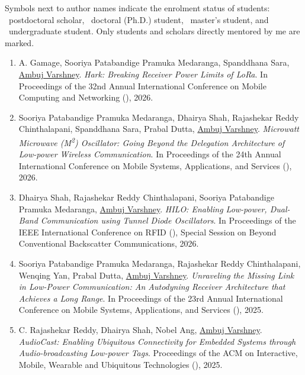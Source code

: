 
\providecommand{\symbollegend}[1]{#1}
\symbollegend{Symbols next to author names indicate the enrolment status of students: \postdoc~postdoctoral scholar, \phd~doctoral (Ph.D.) student, \pg~master's student, and \ug~undergraduate student. Only students and scholars directly mentored by me are marked.}

\begin{enumerate}


\item A. Gamage\postdoc, Sooriya Patabandige Pramuka Medaranga\phd, Spanddhana Sara\phd, \underline{Ambuj Varshney}.
\emph{Hark: Breaking Receiver Power Limits of LoRa}.
In Proceedings of the 32nd Annual International Conference on Mobile Computing and Networking (), 2026.

\item Sooriya Patabandige Pramuka Medaranga\phd, Dhairya Shah\phd, Rajashekar Reddy Chinthalapani\phd, Spanddhana Sara\phd, Prabal Dutta, \underline{Ambuj Varshney}.
\emph{Microwatt Microwave (M\textsuperscript{2}) Oscillator: Going Beyond the Delegation Architecture of Low-power Wireless Communication}.
In Proceedings of the 24th Annual International Conference on Mobile Systems, Applications, and Services (), 2026.

\item Dhairya Shah\phd, Rajashekar Reddy Chinthalapani\phd, Sooriya Patabandige Pramuka Medaranga\phd, \underline{Ambuj Varshney}.
\emph{HILO: Enabling Low-power, Dual-Band Communication using Tunnel Diode Oscillators}.
In Proceedings of the IEEE International Conference on RFID (), Special Session on Beyond Conventional Backscatter Communications, 2026.


\item Sooriya Patabandige Pramuka Medaranga\phd, Rajashekar Reddy Chinthalapani\phd, Wenqing Yan\phd, Prabal Dutta, \underline{Ambuj Varshney}.
\emph{Unraveling the Missing Link in Low-Power Communication: An Autodyning Receiver Architecture that Achieves a Long Range}.
In Proceedings of the 23rd Annual International Conference on Mobile Systems, Applications, and Services (), 2025.

\item C. Rajashekar Reddy\phd, Dhairya Shah\phd, Nobel Ang\ug, \underline{Ambuj Varshney}.
\emph{AudioCast: Enabling Ubiquitous Connectivity for Embedded Systems through Audio-broadcasting Low-power Tags}.
Proceedings of the ACM on Interactive, Mobile, Wearable and Ubiquitous Technologies (), 2025.


\end{enumerate}
